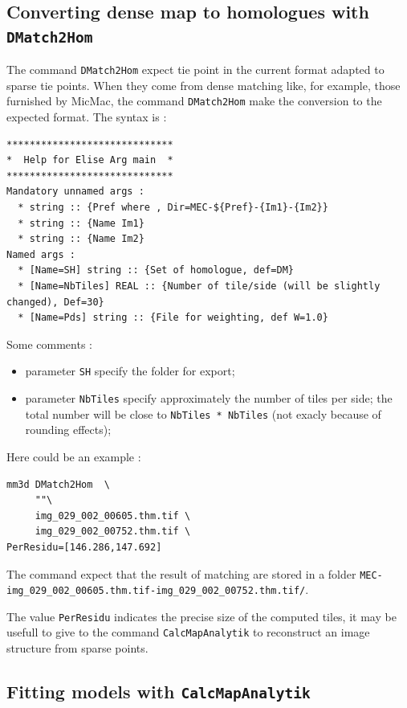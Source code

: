 \subsection{Converting dense map to homologues with {\tt DMatch2Hom}}

The command {\tt DMatch2Hom} expect tie point in the current format adapted
to sparse tie points. When they come from dense matching like, for example,
those furnished by MicMac, the command {\tt DMatch2Hom} make the conversion
to the expected format. The syntax is : 


\begin{verbatim}
*****************************
*  Help for Elise Arg main  *
*****************************
Mandatory unnamed args : 
  * string :: {Pref where , Dir=MEC-${Pref}-{Im1}-{Im2}}
  * string :: {Name Im1}
  * string :: {Name Im2}
Named args : 
  * [Name=SH] string :: {Set of homologue, def=DM}
  * [Name=NbTiles] REAL :: {Number of tile/side (will be slightly changed), Def=30}
  * [Name=Pds] string :: {File for weighting, def W=1.0}
\end{verbatim}

Some comments :

\begin{itemize}
   \item parameter {\tt SH} specify the folder  for export;
   \item parameter {\tt NbTiles} specify approximately the number of tiles per side;
         the total number will be close to {\tt NbTiles * NbTiles} (not exacly because of rounding effects);
\end{itemize}

Here could be an example :

\begin{verbatim}
mm3d DMatch2Hom  \
     ""\
     img_029_002_00605.thm.tif \
     img_029_002_00752.thm.tif \
PerResidu=[146.286,147.692]
\end{verbatim}

The command expect that the result of matching are stored in a folder 
{\tt MEC-img\_029\_002\_00605.thm.tif-img\_029\_002\_00752.thm.tif/}.

The value {\tt PerResidu} indicates the precise size of the computed tiles,
it may be usefull to give to the command {\tt CalcMapAnalytik} to reconstruct
an image structure from sparse points.


\subsection{Fitting models with {\tt CalcMapAnalytik}}


